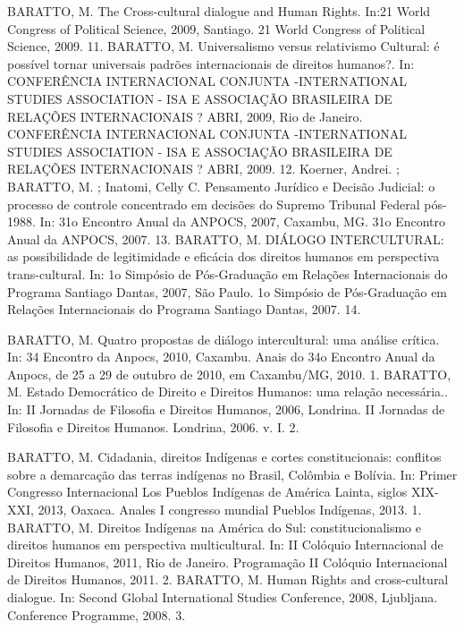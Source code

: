   \begin{cvhonors}
  \cvhonor
    {BARATTO, M.}
    {The Cross-cultural dialogue and Human Rights. In:21 World Congress of Political Science, 2009, Santiago. 21 World Congress of Political Science, 2009.}
    {}
    {11. }
  \cvhonor
    {BARATTO, M.}
    {Universalismo versus relativismo Cultural: é possível tornar universais padrões internacionais de direitos humanos?. In: CONFERÊNCIA INTERNACIONAL CONJUNTA -INTERNATIONAL STUDIES ASSOCIATION - ISA E ASSOCIAÇÃO BRASILEIRA DE RELAÇÕES INTERNACIONAIS ? ABRI, 2009, Rio de Janeiro. CONFERÊNCIA INTERNACIONAL CONJUNTA -INTERNATIONAL STUDIES ASSOCIATION - ISA E ASSOCIAÇÃO BRASILEIRA DE RELAÇÕES INTERNACIONAIS ? ABRI, 2009.}
    {}
    {12. }
  \cvhonor
    {Koerner, Andrei. ; BARATTO, M. ; Inatomi, Celly C.}
    {Pensamento Jurídico e Decisão Judicial: o processo de controle
    concentrado em decisões do Supremo Tribunal Federal pós-1988. In: 31o Encontro Anual da ANPOCS, 2007, Caxambu,
    MG. 31o Encontro Anual da ANPOCS, 2007.}
    {}
    {13. }
  \cvhonor
    {BARATTO, M.}
    {DIÁLOGO INTERCULTURAL: as possibilidade de legitimidade e eficácia dos direitos humanos em perspectiva trans-cultural. In: 1o Simpósio de Pós-Graduação em Relações Internacionais do Programa Santiago Dantas, 2007, São Paulo. 1o Simpósio de Pós-Graduação em Relações Internacionais do Programa Santiago Dantas, 2007.}
    {}
    {14. }
\end{cvhonors}


\begin{cvhonors}
  \cvhonor
    {BARATTO, M.}
    {Quatro propostas de diálogo intercultural: uma análise crítica. In: 34 Encontro da Anpocs, 2010, Caxambu. Anais do 34o Encontro Anual da Anpocs, de 25 a 29 de outubro de 2010, em Caxambu/MG, 2010.}
    {}
    {1. }
  \cvhonor
    {BARATTO, M.}
  {Estado Democrático de Direito e Direitos Humanos: uma relação necessária.. In: II Jornadas de Filosofia e Direitos Humanos, 2006, Londrina. II Jornadas de Filosofia e Direitos Humanos. Londrina, 2006. v. I.}
    {}
    {2. }
\end{cvhonors}


\begin{cvhonors}
  \cvhonor
    {BARATTO, M.}
    {Cidadania, direitos Indígenas e cortes constitucionais: conflitos sobre a demarcação das terras indígenas no Brasil, Colômbia e Bolívia. In: Primer Congresso Internacional Los Pueblos Indígenas de América Lainta, siglos XIX-XXI, 2013, Oaxaca. Anales I congresso mundial Pueblos Indígenas, 2013.}
    {}
    {1. }
  \cvhonor
    {BARATTO, M.}
    {Direitos Indígenas na América do Sul: constitucionalismo e direitos humanos em perspectiva multicultural. In: II Colóquio Internacional de Direitos Humanos, 2011, Rio de Janeiro. Programação II Colóquio Internacional de Direitos Humanos, 2011.}
    {}
    {2. }
  \cvhonor
    {BARATTO, M.}
    {Human Rights and cross-cultural dialogue. In: Second Global International Studies Conference, 2008, Ljubljana. Conference Programme, 2008.}
    {}
    {3. }
\end{cvhonors}

